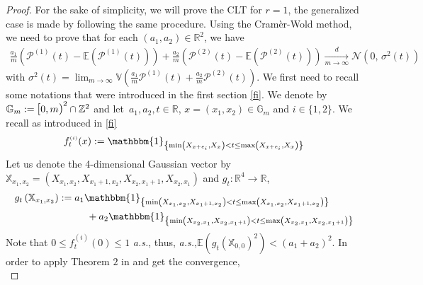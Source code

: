 \documentclass[12pt]{article}
\theoremstyle{Theorem}
\begin{document}
\begin{proof} For the sake of simplicity, we will prove the CLT for $r=1$, the generalized case is made by following the same procedure. Using the Cramèr-Wold method, we need to prove that for each $(a_1, a_2) \in \mathbb{R}^{2}$, we have 
\begin{align*}
\frac{a_{1}}{m}\left(\mathcal{P}^{\scriptscriptstyle (1)}(t) - \mathbb{E}\left(\mathcal{P}^{\scriptscriptstyle (1)}(t)\right)\right) + \frac{a_{2}}{m}\left(\mathcal{P}^{\scriptscriptstyle (2)}(t) - \mathbb{E}\left(\mathcal{P}^{\scriptscriptstyle (2)}(t)\right)\right) \xrightarrow[m \to \infty]{d} \mathcal{N}\left(0,\,\sigma^{2}(t)\right) 
\end{align*}
with $\sigma^{2}(t) = \lim_{m \to \infty} \mathbb{V}\left( \frac{a_{1}}{m}\mathcal{P}^{\scriptscriptstyle (1)}(t) + \frac{a_{2}}{m}\mathcal{P}^{\scriptscriptstyle (2)}(t) \right)$.
We first need to recall some notations that were introduced in the first section \eqref{fi}. We denote by $\mathbb{G}_{m} := \text{\larger[1]{$[$}}0, m \text{\larger[1]{$)$}}^{2} \cap \mathbb{Z}^{2}$ and let~$a_{1}, a_{2}, t \in \mathbb{R}$, $x=(x_{1}, x_{2}) \in \mathbb{G}_{m}$ and $i \in \{1,2\}$.  We recall as introduced in \eqref{fi}
\begin{align*}
f_{t}^{\scriptscriptstyle (i)}(x) := \mathbbm{1}_{\left\{\min\left(X_{x+e_{i}}, X_{\scriptscriptstyle x}\right) < t \leq \max\left(X_{x+e_{i}}, X_{\scriptscriptstyle x}\right)\right\}}
\end{align*}
Let us denote the 4-dimensional Gaussian vector by $\mathbb{X}_{x_1, x_2} = (X_{x_1, x_2}, X_{x_1 + 1, x_2}, X_{x_2, x_1+1}, X_{x_2, x_1} )$ and $g_{t} : \mathbb{R}^{4} \to \mathbb{R}$, 
\begin{align*}
g_{t}\left(\mathbb{X}_{x_1, x_2}\right) & := a_{1}\mathbbm{1}_{\left\{\min\left(X_{x_1, x_2}, X_{\scriptscriptstyle x_1 +  1, \scriptscriptstyle x_2}\right) < t \leq \max\left(X_{x_1, x_2}, X_{\scriptscriptstyle x_1 +  1, \scriptscriptstyle x_2}\right)\right\}} \\
& \hspace{1cm} + a_{2}\mathbbm{1}_{\left\{\min\left(X_{x_2, x_1}, X_{\scriptscriptstyle x_2, x_1 + 1}\right) < t \leq \max\left(X_{x_2, x_1}, X_{\scriptscriptstyle x_2, x_1 + 1}\right)\right\}}
\end{align*}
Note that $0 \leq f_{t}^{\scriptscriptstyle (i)}(0) \leq 1$ \textit{a.s.}, thus, \textit{a.s.},$\mathbb{E}\left(g_{t}\left(\mathbb{X}_{\scriptscriptstyle  0, 0}\right)^{2}\right) < (a_{1} + a_{2})^{2}$. In order to apply Theorem $2$ in \cite{arcones} and get the convergence, \\

\end{proof}
\end{document}
